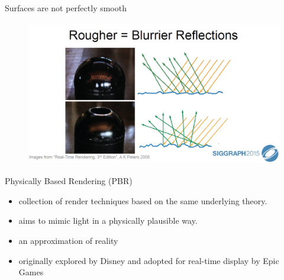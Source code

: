 \documentclass[]{beamer}
\begin{document}
\begin{frame}


    \textcolor{mypink1}{Surfaces are not perfectly smooth }
   

    
    \begin{figure}[h!]
      \begin{center}
        \includegraphics[height=2.5in]{images/10.jpg}
      \end{center}
    \end{figure}
  \end{frame}
    

\begin{frame}


    \textcolor{mypink1}{Physically Based Rendering (PBR)}
   \pause

   \begin{itemize}
       \item collection of render techniques  based on the same underlying theory.\pause
       \item aims to mimic light in a physically plausible way.\pause
       \item  an approximation of reality\pause
       \item originally explored by Disney and adopted for real-time display by Epic Games \pause
   \end{itemize}


  \end{frame}
    
\end{document}
